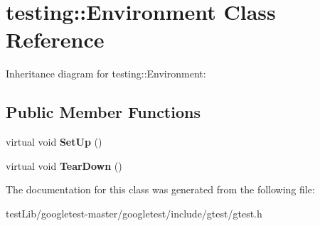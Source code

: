 \hypertarget{classtesting_1_1Environment}{}\section{testing\+:\+:Environment Class Reference}
\label{classtesting_1_1Environment}


Inheritance diagram for testing\+:\+:Environment\+:
\subsection*{Public Member Functions}
\begin{DoxyCompactItemize}
\item 
\mbox{\label{classtesting_1_1Environment_a1bf8cafaa9d4eba9feb98655ee434eb3}} 
virtual void {\bfseries Set\+Up} ()
\item 
\mbox{\label{classtesting_1_1Environment_a039bdaa705c46b9b88234cf4d3bb6254}} 
virtual void {\bfseries Tear\+Down} ()
\end{DoxyCompactItemize}


The documentation for this class was generated from the following file\+:\begin{DoxyCompactItemize}
\item 
test\+Lib/googletest-\/master/googletest/include/gtest/gtest.\+h\end{DoxyCompactItemize}
